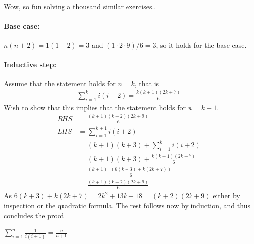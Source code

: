 \documentclass[a4paper, english, 12pt]{article} %
\begin{document}
\begin{answer}
  Wow, so fun solving a thousand similar exercises..
  \paragraph{Base case:} $n(n+2)=1(1+2) = 3$ and $(1\cdot 2 \cdot 9)/6 = 3$,
  so it holds for the base case.
  \paragraph{Inductive step:} Assume that the statement holds for $n = k$, that
  is
  \begin{align*}
    \sum_{i=1}^k i(i+2) = \frac{k(k+1)(2k+7)}{6}
  \end{align*}
  Wish to show that this implies that the statement holds for $n=k+1$.
  \begin{align*}
    RHS & = \frac{(k+1)(k+2)(2k+9)}{6} \\
    LHS & = \sum_{i=1}^{k+1} i(i+2)   \\
        & = (k+1)(k+3) + \sum_{i=1}^{k} i(i+2)  \\
        & = (k+1)(k+3) + \frac{k(k+1)(2k+7)}{6} \\
        & = \frac{(k+1)[(6(k+3) + k(2k+7))]}{6} \\
        & = \frac{(k+1)(k+2)(2k+9)}{6}
  \end{align*}
  As $6(k+3) + k(2k+7) = 2k^2 + 13k + 18 = (k+2)(2k+9)$ either by inspection or
  the quadratic formula. The rest follows now by induction, and thus concludes
  the proof.
\end{answer}

\begin{subproblem}
  $\displaystyle \sum_{i = 1}^n \frac{1}{i(i+1)} = \frac{n}{n+1}$
\end{subproblem}
\end{document}
